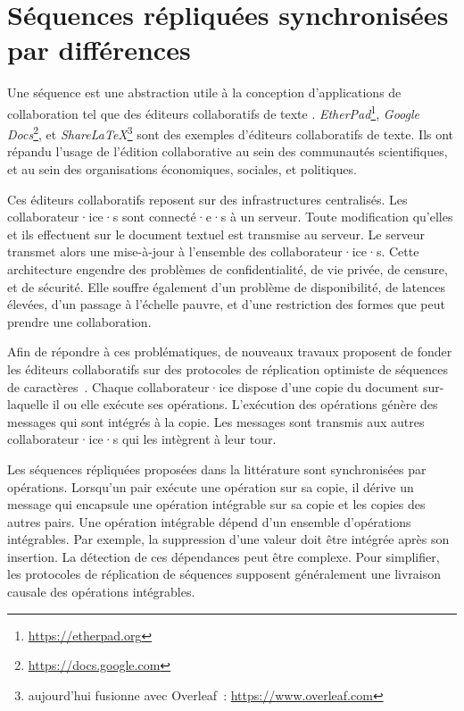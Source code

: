 
\chapter{Séquences répliquées synchronisées par différences}\label{ch:dotted-logootsplit}

\minitoc{}
\bigskip

Une séquence est une abstraction utile à la conception d'applications de collaboration tel que des éditeurs collaboratifs de texte \autocite{2017_nicolas-mute-demo,nedelec2016_crate}.
\emph{EtherPad}\footnote{\url{https://etherpad.org}}, \emph{Google Docs}\footnote{\url{https://docs.google.com}}, et \emph{ShareLaTeX}\footnote{aujourd'hui fusionne avec Overleaf~: \url{https://www.overleaf.com}} sont des exemples d'éditeurs collaboratifs de texte.
Ils ont répandu l'usage de l'édition collaborative au sein des communautés scientifiques, et au sein des organisations économiques, sociales, et politiques.

Ces éditeurs collaboratifs reposent sur des infrastructures centralisés.
Les collaborateur·ice·s sont connecté·e·s à un serveur.
Toute modification qu'elles et ils effectuent sur le document textuel est transmise au serveur.
Le serveur transmet alors une mise-à-jour à l'ensemble des collaborateur·ice·s.
Cette architecture engendre des problèmes de confidentialité, de vie privée, de censure, et de sécurité.
Elle souffre également d'un problème de disponibilité, de latences élevées, d'un passage à l'échelle pauvre,
et d'une restriction des formes que peut prendre une collaboration.

Afin de répondre à ces problématiques, de nouveaux travaux proposent de fonder les éditeurs collaboratifs sur des protocoles de réplication optimiste de séquences de caractères~\autocite{oster_2006_woot,weiss_2009_logoot,preguica_2009_treedoc,roh_2011_rga}.
Chaque collaborateur·ice dispose d'une copie du document sur-laquelle il ou elle exécute ses opérations.
L'exécution des opérations génère des messages qui sont intégrés à la copie.
Les messages sont transmis aux autres collaborateur·ice·s qui les intègrent à leur tour.

Les séquences répliquées proposées dans la littérature sont synchronisées par opérations.
Lorsqu'un pair exécute une opération sur sa copie, il dérive un message qui encapsule une opération intégrable sur sa copie et les copies des autres pairs.
Une opération intégrable dépend d'un ensemble d'opérations intégrables.
Par exemple, la suppression d'une valeur doit être intégrée après son insertion.
La détection de ces dépendances peut être complexe.
Pour simplifier, les protocoles de réplication de séquences supposent généralement une livraison causale des opérations intégrables.

